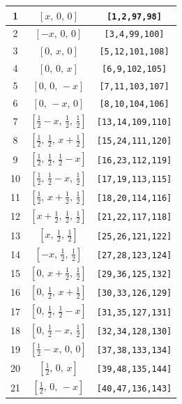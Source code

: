 \documentclass[fleqn,8pt]{jsarticle}
\begin{document}
\begin{longtable}{ccc}
1 & $\left[ x,\, 0,\, 0 \right]$ & {\tt [1,2,97,98]} \\ \hline
2 & $\left[ - x,\, 0,\, 0 \right]$ & {\tt [3,4,99,100]} \\ \hline
3 & $\left[ 0,\, x,\, 0 \right]$ & {\tt [5,12,101,108]} \\ \hline
4 & $\left[ 0,\, 0,\, x \right]$ & {\tt [6,9,102,105]} \\ \hline
5 & $\left[ 0,\, 0,\, - x \right]$ & {\tt [7,11,103,107]} \\ \hline
6 & $\left[ 0,\, - x,\, 0 \right]$ & {\tt [8,10,104,106]} \\ \hline
7 & $\left[ \frac{1}{2} - x,\, \frac{1}{2},\, \frac{1}{2} \right]$ & {\tt [13,14,109,110]} \\ \hline
8 & $\left[ \frac{1}{2},\, \frac{1}{2},\, x + \frac{1}{2} \right]$ & {\tt [15,24,111,120]} \\ \hline
9 & $\left[ \frac{1}{2},\, \frac{1}{2},\, \frac{1}{2} - x \right]$ & {\tt [16,23,112,119]} \\ \hline
10 & $\left[ \frac{1}{2},\, \frac{1}{2} - x,\, \frac{1}{2} \right]$ & {\tt [17,19,113,115]} \\ \hline
11 & $\left[ \frac{1}{2},\, x + \frac{1}{2},\, \frac{1}{2} \right]$ & {\tt [18,20,114,116]} \\ \hline
12 & $\left[ x + \frac{1}{2},\, \frac{1}{2},\, \frac{1}{2} \right]$ & {\tt [21,22,117,118]} \\ \hline
13 & $\left[ x,\, \frac{1}{2},\, \frac{1}{2} \right]$ & {\tt [25,26,121,122]} \\ \hline
14 & $\left[ - x,\, \frac{1}{2},\, \frac{1}{2} \right]$ & {\tt [27,28,123,124]} \\ \hline
15 & $\left[ 0,\, x + \frac{1}{2},\, \frac{1}{2} \right]$ & {\tt [29,36,125,132]} \\ \hline
16 & $\left[ 0,\, \frac{1}{2},\, x + \frac{1}{2} \right]$ & {\tt [30,33,126,129]} \\ \hline
17 & $\left[ 0,\, \frac{1}{2},\, \frac{1}{2} - x \right]$ & {\tt [31,35,127,131]} \\ \hline
18 & $\left[ 0,\, \frac{1}{2} - x,\, \frac{1}{2} \right]$ & {\tt [32,34,128,130]} \\ \hline
19 & $\left[ \frac{1}{2} - x,\, 0,\, 0 \right]$ & {\tt [37,38,133,134]} \\ \hline
20 & $\left[ \frac{1}{2},\, 0,\, x \right]$ & {\tt [39,48,135,144]} \\ \hline
21 & $\left[ \frac{1}{2},\, 0,\, - x \right]$ & {\tt [40,47,136,143]} \\ \hline

\end{longtable}
\end{document}
